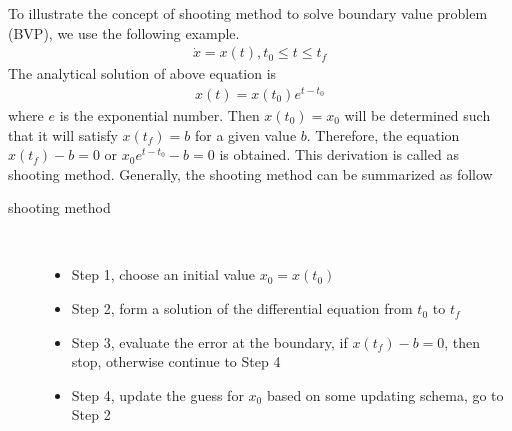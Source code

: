 \documentclass  [
  paper    = a4,
  BCOR     = 10mm,
  twoside,
  fontsize = 12pt,
  fleqn,
  toc      = bibnumbered,
  toc      = listofnumbered,
  numbers  = noendperiod,
  headings = normal,
  listof   = leveldown,
  version  = 3.03
]                                       {scrreprt}
\newcommand{\<}{\langle}
\renewcommand{\>}{\rangle}
\begin{document}
To illustrate the concept of shooting method to solve boundary value problem (BVP), we use the following example.
\begin{align*}
	\dot{x} = x(t), t_0 \leq t \leq t_f	
\end{align*}
The analytical solution of above equation is 
\begin{align*}
	x(t) = x(t_0)e^{t - t_0}
\end{align*}
where $e$ is the exponential number. Then $x(t_0) = x_0$ will be determined such that it will satisfy $x(t_f)=b$ for a given value $b$. Therefore, the equation $x(t_f)-b = 0$ or $x_0e^{t - t_0}-b =0$ is obtained. This derivation is called as shooting method. Generally, the shooting method can be summarized as follow
\begin{description}
	\item[shooting method] \
	\begin{itemize}
		\item Step 1, choose an initial value $x_0 = x(t_0)$ 
		\item Step 2, form a solution of the differential equation from $t_0$ to $t_f$
		\item Step 3, evaluate the error at the boundary, if $x(t_f) - b = 0$, then stop, otherwise continue to Step 4 
		\item Step 4, update the guess for $x_0$ based on some updating schema, go to Step 2
	\end{itemize}
\end{description}
\end{document}
